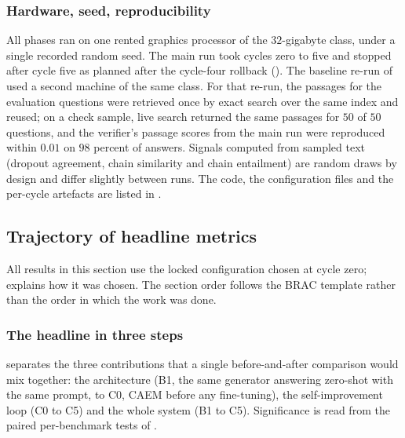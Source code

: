 \subsubsection{Hardware, seed, reproducibility}
\label{sec:setup-reproducibility}

All phases ran on one rented graphics processor of the $32$-gigabyte class, under a single recorded random seed. The main run took cycles zero to five and stopped after cycle five as planned after the cycle-four rollback (). The baseline re-run of  used a second machine of the same class. For that re-run, the passages for the evaluation questions were retrieved once by exact search over the same index and reused; on a check sample, live search returned the same passages for $50$ of $50$ questions, and the verifier's passage scores from the main run were reproduced within $0.01$ on $98$ percent of answers. Signals computed from sampled text (dropout agreement, chain similarity and chain entailment) are random draws by design and differ slightly between runs. The code, the configuration files and the per-cycle artefacts are listed in .

\subsection{Trajectory of headline metrics}
\label{sec:headline-trajectory}

All results in this section use the locked configuration chosen at cycle zero;  explains how it was chosen. The section order follows the BRAC template rather than the order in which the work was done.

\subsubsection{The headline in three steps}
\label{sec:headline-pooled}

 separates the three contributions that a single before-and-after comparison would mix together: the architecture (B1, the same generator answering zero-shot with the same prompt, to C0, CAEM before any fine-tuning), the self-improvement loop (C0 to C5) and the whole system (B1 to C5). Significance is read from the paired per-benchmark tests of .





